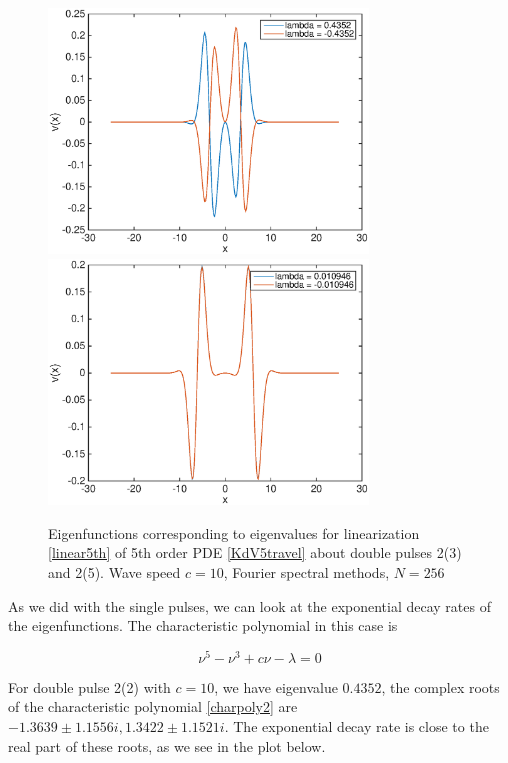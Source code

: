 \documentclass[12pt]{article}
\begin{document}
\begin{figure}[H]
	\includegraphics[width=8.5cm]{four10dp1eigenfns}
	\includegraphics[width=8.5cm]{four10dp3eigenfns}
	\caption{Eigenfunctions corresponding to eigenvalues for linearization \eqref{linear5th} of 5th order PDE \eqref{KdV5travel} about double pulses 2(3) and 2(5). Wave speed $c = 10$, Fourier spectral methods, $N = 256$}
\end{figure}

As we did with the single pulses, we can look at the exponential decay rates of the eigenfunctions. The characteristic polynomial in this case is 

\begin{equation} \label{charpoly2}
\nu^5 - \nu^3 + c \nu - \lambda = 0
\end{equation}

For double pulse 2(2) with $c = 10$, we have eigenvalue $0.4352$, the complex roots of the characteristic polynomial \eqref{charpoly2} are $-1.3639 \pm 1.1556i, 1.3422 \pm 1.1521i$. The exponential decay rate is close to the real part of these roots, as we see in the plot below.
\end{document}
